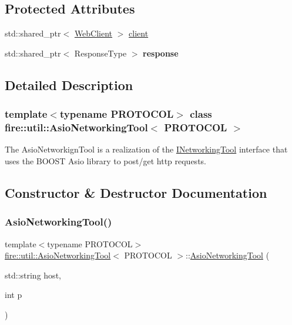 \subsection*{Protected Attributes}
\begin{DoxyCompactItemize}
\item 
std\+::shared\+\_\+ptr$<$ \hyperlink{a01541}{Web\+Client} $>$ \hyperlink{a01601_a57412dca950e86b857ee4795a9b6517e}{client}
\item 
\mbox{\label{a01601_a613f571530390cf1d05538c658c13b9e}} 
std\+::shared\+\_\+ptr$<$ Response\+Type $>$ {\bfseries response}
\end{DoxyCompactItemize}


\subsection{Detailed Description}
\subsubsection*{template$<$typename P\+R\+O\+T\+O\+C\+OL$>$\newline
class fire\+::util\+::\+Asio\+Networking\+Tool$<$ P\+R\+O\+T\+O\+C\+O\+L $>$}

The Asio\+Networkign\+Tool is a realization of the \hyperlink{a01609}{I\+Networking\+Tool} interface that uses the B\+O\+O\+ST Asio library to post/get http requests. 

\subsection{Constructor \& Destructor Documentation}
\mbox{\label{a01601_a5edd72ce9937e052a82e7564500b3861}} 
\subsubsection{\texorpdfstring{Asio\+Networking\+Tool()}{AsioNetworkingTool()}}
{\footnotesize\ttfamily template$<$typename P\+R\+O\+T\+O\+C\+OL$>$ \\
\hyperlink{a01601}{fire\+::util\+::\+Asio\+Networking\+Tool}$<$ P\+R\+O\+T\+O\+C\+OL $>$\+::\hyperlink{a01601}{Asio\+Networking\+Tool} (\begin{DoxyParamCaption}\item[{std\+::string}]{host,  }\item[{int}]{p }\end{DoxyParamCaption})\hspace{0.3cm}{\ttfamily [inline]}}

